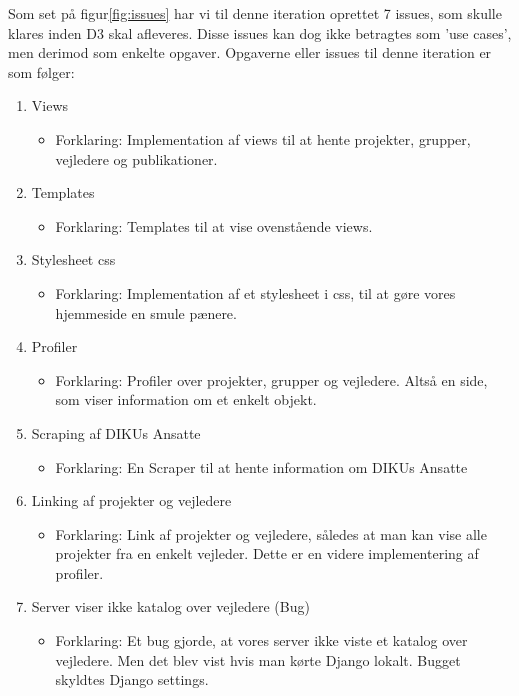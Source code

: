 \documentclass[11pt]{article}
\begin{document}
Som set på figur\ref{fig:issues} har vi til denne iteration oprettet 7 issues, som skulle klares inden D3 skal afleveres. Disse issues kan dog ikke betragtes som 'use cases', men derimod som enkelte opgaver. Opgaverne eller issues til denne iteration er som følger:

\begin{enumerate}
\item Views
	\begin{itemize}
	\item Forklaring: Implementation af views til at hente projekter, grupper, vejledere og publikationer.
	\end{itemize}
\item Templates
	\begin{itemize}
	\item Forklaring: Templates til at vise ovenstående views.
	\end{itemize}
\item Stylesheet css
	\begin{itemize}
	\item Forklaring: Implementation af et stylesheet i css, til at gøre vores hjemmeside en smule pænere.
	\end{itemize}
\item Profiler
	\begin{itemize}
	\item Forklaring: Profiler over projekter, grupper og vejledere. Altså en side, som viser information om et enkelt objekt.
	\end{itemize}
\item Scraping af DIKUs Ansatte
	\begin{itemize}
	\item Forklaring: En Scraper til at hente information om DIKUs Ansatte
	\end{itemize}
\item Linking af projekter og vejledere
	\begin{itemize}
	\item Forklaring: Link af projekter og vejledere, således at man kan vise alle projekter fra en enkelt vejleder. Dette er en videre implementering af profiler.
	\end{itemize}
\item Server viser ikke katalog over vejledere (Bug)
	\begin{itemize}
	\item Forklaring: Et bug gjorde, at vores server ikke viste et katalog over vejledere. Men det blev vist hvis man kørte Django lokalt. Bugget skyldtes Django settings.
	\end{itemize}
\end{enumerate}
\end{document}
